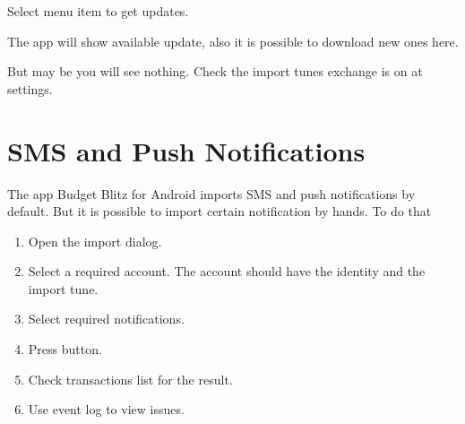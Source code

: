 \documentclass[a4paper,10pt,english]{sphinxmanual}
\begin{document}
Select menu item  to get updates.

\noindent{}
\noindent{}
\noindent{}

The app will show available update, also it is possible to download new ones here.

\noindent{}
\noindent{}
\noindent{}
\noindent{}

But may be you will see nothing. Check the import tunes exchange is on at settings.


\section{SMS and Push Notifications}
\label{\detokenize{import:sms-and-push-notifications}}
The app Budget Blitz for Android imports SMS and push notifications by default. But it is possible to import
certain notification by hands. To do that
\begin{enumerate}
\def\theenumi{\arabic{enumi}}
\def\labelenumi{\theenumi .}
\makeatletter\def\p@enumii{\p@enumi \theenumi .}\makeatother
\item {} 
Open the import dialog.

\item {} 
Select a required account. The account should have the identity and the import tune.

\item {} 
Select required notifications.

\item {} 
Press  button.

\item {} 
Check transactions list for the result.

\item {} 
Use event log to view issues.

\end{enumerate}
\end{document}
